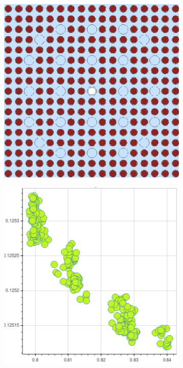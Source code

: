 \clearpage

\begin{figure}[h!]
\centering
\begin{subfigure}{0.42\textwidth}
  \centering
  \includegraphics[width=0.9\linewidth]{figures/unsupervised/features/assm-16/geometry}
  \caption{}
  \label{fig:chap10-capt-mean-spect-ind-geom}
\end{subfigure}%
\begin{subfigure}{0.42\textwidth}
  \centering
  \includegraphics[width=0.9\linewidth]{figures/unsupervised/features/assm-16/u238-capt/mean-spect-ind/mgxs}

\end{subfigure}
\end{figure}
